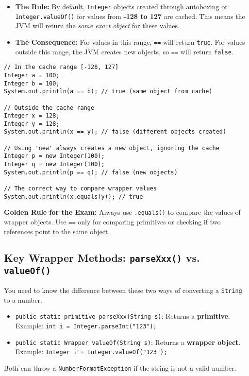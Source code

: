 \documentclass[12pt]{article}
\begin{document}
\begin{enumerate}[label=(\arabic*)]
\begin{itemize}
\item \textbf{The Rule:} By default, \texttt{Integer} objects created through autoboxing or \texttt{Integer.valueOf()} for values from \textbf{-128 to 127} are cached. This means the JVM will return the \textit{same exact object} for these values.
\item \textbf{The Consequence:} For values in this range, \texttt{==} will return \texttt{true}. For values outside this range, the JVM creates new objects, so \texttt{==} will return \texttt{false}.
\end{itemize}

\begin{verbatim}
// In the cache range [-128, 127]
Integer a = 100;
Integer b = 100;
System.out.println(a == b); // true (same object from cache)

// Outside the cache range
Integer x = 128;
Integer y = 128;
System.out.println(x == y); // false (different objects created)

// Using 'new' always creates a new object, ignoring the cache
Integer p = new Integer(100);
Integer q = new Integer(100);
System.out.println(p == q); // false (new objects)

// The correct way to compare wrapper values
System.out.println(x.equals(y)); // true
\end{verbatim}
\textbf{Golden Rule for the Exam:} Always use \texttt{.equals()} to compare the values of wrapper objects. Use \texttt{==} only for comparing primitives or checking if two references point to the same object.

\subsection*{Key Wrapper Methods: \texttt{parseXxx()} vs. \texttt{valueOf()}}
You need to know the difference between these two ways of converting a \texttt{String} to a number.
\begin{itemize}
\item \texttt{public static primitive parseXxx(String s)}: Returns a \textbf{primitive}. Example: \texttt{int i = Integer.parseInt("123");}
\item \texttt{public static Wrapper valueOf(String s)}: Returns a \textbf{wrapper object}. Example: \texttt{Integer i = Integer.valueOf("123");}
\end{itemize}
Both can throw a \texttt{NumberFormatException} if the string is not a valid number.


\end{enumerate}
\end{document}
